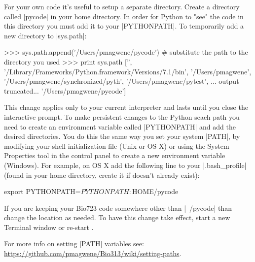 For your own code it's useful to setup a separate directory. Create a directory called |pycode| in your home directory. In order for Python to "see" the code in this directory you must add it to your |PYTHONPATH|. To temporarily add a new directory to |sys.path|:
\begin{python}
>>> sys.path.append('/Users/pmagwene/pycode') # substitute the path to the directory you used
>>> print sys.path
['', '/Library/Frameworks/Python.framework/Versions/7.1/bin', '/Users/pmagwene', 
'/Users/pmagwene/synchronized/pyth', '/Users/pmagwene/pytest', 
... output truncated...
'/Users/pmagwene/pycode']
\end{python}
%
This change applies only to your current interpreter and lasts until you close the interactive prompt. To make persistent changes to the Python seach path you need to create an environment variable called |PYTHONPATH| and add the desired directories.  You do this the same way you set your system |PATH|, by modifying your shell initialization file (Unix or OS X) or using the System Properties tool in the control panel to create a new environment variable (Windows). For example, on OS X add the following line to your |.bash_profile| (found in your home directory, create it if doesn't already exist):
%
\begin{bash}
export PYTHONPATH=$PYTHONPATH:$HOME/pycode   
\end{bash}
%
If you are keeping your Bio723 code somewhere other than |~/pycode| than change the location as needed. To have this change take effect, start a new Terminal window or re-start \ipy.

For more info on setting |PATH| variables see: \url{https://github.com/pmagwene/Bio313/wiki/setting-paths}.